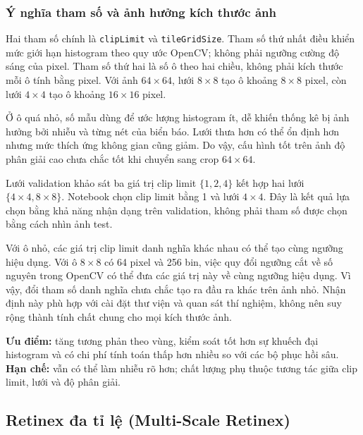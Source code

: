 \subsubsection{Ý nghĩa tham số và ảnh hưởng kích thước ảnh}
Hai tham số chính là \texttt{clipLimit} và \texttt{tileGridSize}. Tham số thứ nhất điều khiển mức giới hạn histogram theo quy ước OpenCV; không phải ngưỡng cường độ sáng của pixel. Tham số thứ hai là số ô theo hai chiều, không phải kích thước mỗi ô tính bằng pixel. Với ảnh $64\times64$, lưới $8\times8$ tạo ô khoảng $8\times8$ pixel, còn lưới $4\times4$ tạo ô khoảng $16\times16$ pixel.

Ở ô quá nhỏ, số mẫu dùng để ước lượng histogram ít, dễ khiến thống kê bị ảnh hưởng bởi nhiễu và từng nét của biển báo. Lưới thưa hơn có thể ổn định hơn nhưng mức thích ứng không gian cũng giảm. Do vậy, cấu hình tốt trên ảnh độ phân giải cao chưa chắc tốt khi chuyển sang crop $64\times64$.

Lưới validation khảo sát ba giá trị clip limit $\{1,2,4\}$ kết hợp hai lưới $\{4\times4,8\times8\}$. Notebook chọn clip limit bằng 1 và lưới $4\times4$. Đây là kết quả lựa chọn bằng khả năng nhận dạng trên validation, không phải tham số được chọn bằng cách nhìn ảnh test.

Với ô nhỏ, các giá trị clip limit danh nghĩa khác nhau có thể tạo cùng ngưỡng hiệu dụng. Với ô $8\times8$ có 64 pixel và 256 bin, việc quy đổi ngưỡng cắt về số nguyên trong OpenCV có thể đưa các giá trị này về cùng ngưỡng hiệu dụng. Vì vậy, đổi tham số danh nghĩa chưa chắc tạo ra đầu ra khác trên ảnh nhỏ. Nhận định này phù hợp với cài đặt thư viện và quan sát thí nghiệm, không nên suy rộng thành tính chất chung cho mọi kích thước ảnh.

\textbf{Ưu điểm:} tăng tương phản theo vùng, kiểm soát tốt hơn sự khuếch đại histogram và có chi phí tính toán thấp hơn nhiều so với các bộ phục hồi sâu. \textbf{Hạn chế:} vẫn có thể làm nhiễu rõ hơn; chất lượng phụ thuộc tương tác giữa clip limit, lưới và độ phân giải.

\subsection{Retinex đa tỉ lệ (Multi-Scale Retinex)}
